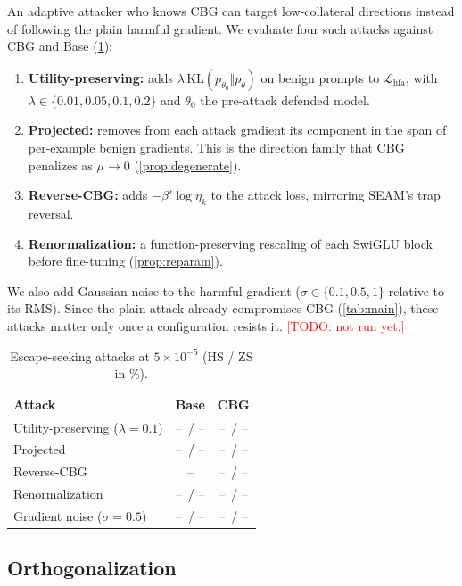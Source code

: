 \documentclass[11pt]{article}
\newcommand{\Lhfa}{\mathcal{L}_{\mathrm{hfa}}}
\newcommand{\etak}{\eta_{k}}
\newcommand{\tbd}{\textcolor{gray}{--}}
\newcommand{\todo}[1]{\textcolor{red}{[TODO: #1]}}
\begin{document}
An adaptive attacker who knows CBG can target low-collateral directions instead of following the plain harmful gradient. We evaluate four such attacks against CBG and Base (\cref{tab:adaptive}):
\begin{enumerate}
  \item \textbf{Utility-preserving:} adds $\lambda\,\mathrm{KL}(p_{\theta_0}\Vert p_\theta)$ on benign prompts to $\Lhfa$, with $\lambda\in\{0.01,0.05,0.1,0.2\}$ and $\theta_0$ the pre-attack defended model.
  \item \textbf{Projected:} removes from each attack gradient its component in the span of per-example benign gradients. This is the direction family that CBG penalizes as $\mu\to0$ (\cref{prop:degenerate}).
  \item \textbf{Reverse-CBG:} adds $-\beta'\log\etak$ to the attack loss, mirroring SEAM's trap reversal.
  \item \textbf{Renormalization:} a function-preserving rescaling of each SwiGLU block before fine-tuning (\cref{prop:reparam}).
\end{enumerate}
We also add Gaussian noise to the harmful gradient ($\sigma\in\{0.1,0.5,1\}$ relative to its RMS). Since the plain attack already compromises CBG (\cref{tab:main}), these attacks matter only once a configuration resists it. \todo{not run yet.}

\begin{table}[t]
\centering
\small
\caption{Escape-seeking attacks at $5\times10^{-5}$ (HS / ZS in \%).}
\label{tab:adaptive}
\begin{tabular}{lcc}
\toprule
Attack & Base & CBG\\
\midrule
Utility-preserving ($\lambda=0.1$) & \tbd\ / \tbd & \tbd\ / \tbd\\
Projected                          & \tbd\ / \tbd & \tbd\ / \tbd\\
Reverse-CBG                        & -- & \tbd\ / \tbd\\
Renormalization                    & \tbd\ / \tbd & \tbd\ / \tbd\\
Gradient noise ($\sigma=0.5$)      & \tbd\ / \tbd & \tbd\ / \tbd\\
\bottomrule
\end{tabular}
\end{table}



\subsection{Orthogonalization}
\label{sec:orthogonal}
\end{document}
